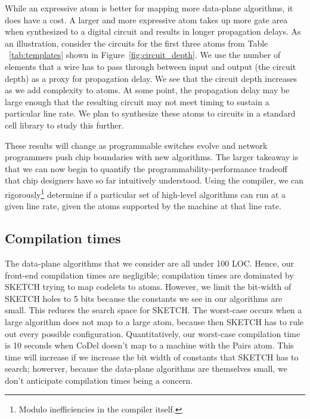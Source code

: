 While an expressive atom is better for mapping more data-plane algorithms, it
does have a cost. A larger and more expressive atom takes up more gate area
when synthesized to a digital circuit and results in longer propagation delays.
As an illustration, consider the circuits for the first three atoms from Table
~\ref{tab:templates} shown in Figure~\ref{fig:circuit_depth}. We use the number
of elements that a wire has to pass through between input and output (the
circuit depth) as a proxy for propagation delay. We see that the circuit depth
increases as we add complexity to atoms. At some point, the propagation delay
may be large enough that the resulting circuit may not meet timing to sustain a
particular line rate. We plan to synthesize these atoms to circuits in a
standard cell library to study this further.

These results will change as programmable switches evolve and network
programmers push chip boundaries with new algorithms.  The larger takeaway is
that we can now begin to quantify the programmability-performance tradeoff that
chip designers have so far intuitively understood. Using the \pktlanguage
compiler, we can rigorously\footnote{Modulo inefficiencies in the compiler
itself.} determine if a particular set of high-level algorithms can run at a
given line rate, given the atoms supported by the \absmachine machine at that
line rate.

\subsection{Compilation times}
The data-plane algorithms that we consider are all under 100 LOC. Hence, our
front-end compilation times are negligible; compilation times are dominated by
SKETCH trying to map codelets to atoms. However, we limit the bit-width of
SKETCH holes to 5 bits because the constants we see in our algorithms are
small.  This reduces the search space for SKETCH.  The worst-case occurs when a
large algorithm does not map to a large atom, because then SKETCH has to rule
out every possible configuration. Quantitatively, our worst-case compilation
time is 10 seconds when CoDel doesn't map to a \absmachine machine with the
Pairs atom.  This time will increase if we increase the bit width of constants
that SKETCH has to search; howerver, because the data-plane algorithms are
themselves small, we don't anticipate compilation times being a concern.
